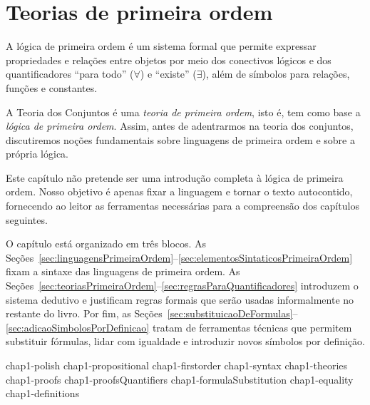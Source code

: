 \chapter{Teorias de primeira ordem}\label{chap:teoriasPrimeiraOrdem}
A lógica de primeira ordem é um sistema formal que permite expressar propriedades e relações entre objetos por meio dos conectivos lógicos e dos quantificadores ``para todo'' ($\forall$) e ``existe'' ($\exists$), além de símbolos para relações, funções e constantes.

A Teoria dos Conjuntos é uma \emph{teoria de primeira ordem}, isto é, tem como base a \emph{lógica de primeira ordem}. 
Assim, antes de adentrarmos na teoria dos conjuntos, discutiremos noções fundamentais sobre linguagens de primeira ordem e sobre a própria lógica.

Este capítulo não pretende ser uma introdução completa à lógica de primeira ordem. 
Nosso objetivo é apenas fixar a linguagem e tornar o texto autocontido, fornecendo ao leitor as ferramentas necessárias para a compreensão dos capítulos seguintes.

O capítulo está organizado em três blocos. 
As Seções~\ref{sec:linguagensPrimeiraOrdem}--\ref{sec:elementosSintaticosPrimeiraOrdem} fixam a sintaxe das linguagens de primeira ordem. 
As Seções~\ref{sec:teoriasPrimeiraOrdem}--\ref{sec:regrasParaQuantificadores} introduzem o sistema dedutivo e justificam regras formais que serão usadas informalmente no restante do livro. 
Por fim, as Seções~\ref{sec:substituicaoDeFormulas}--\ref{sec:adicaoSimbolosPorDefinicao} tratam de ferramentas técnicas que permitem substituir fórmulas, lidar com igualdade e introduzir novos símbolos por definição.

{chap1-polish}
{chap1-propositional}
{chap1-firstorder}
{chap1-syntax}
{chap1-theories}
{chap1-proofs}
{chap1-proofsQuantifiers}
{chap1-formulaSubstitution}
{chap1-equality}
{chap1-definitions}
